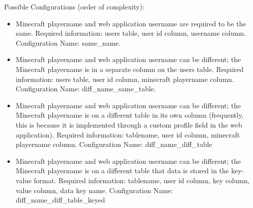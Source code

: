 \documentclass[letterpaper,12pt]{article}
\begin{document}
  Possible Configurations (order of complexity):
  \begin{itemize}
    \item Minecraft playername and web application username are required to be
      the same. Required information: users table, user id column, username
      column. Configuration Name: same\_name.
    \item Minecraft playername and web application username can be different;
      the Minecraft playername is in a separate column on the users table.
      Required information: users table, user id column, minecraft playername
      column. Configuration Name: diff\_name\_same\_table.
    \item Minecraft playername and web application username can be different;
      the Minecraft playername is on a different table in its own column
      (frequently, this is because it is implemented through a custom profile
      field in the web application). Required information: tablename, user id
      column, minecraft playername column.
      Configuration Name: diff\_name\_diff\_table
    \item Minecraft playername and web application username can be different;
      the Minecraft playername is on a different table that data is stored in
      the key-value format. Required information: tablename, user id column,
      key column, value column, data key name.
      Configuration Name: diff\_name\_diff\_table\_keyed
  \end{itemize}
  \clearpage
\end{document}
